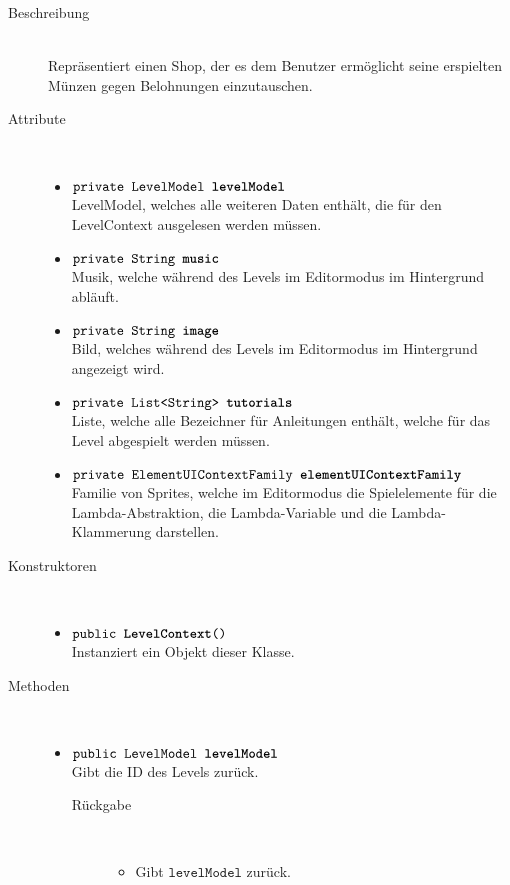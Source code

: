\begin{description}
\item[Beschreibung] \hfill \\ Repräsentiert einen Shop, der es dem Benutzer ermöglicht seine erspielten Münzen gegen Belohnungen einzutauschen.

\item[Attribute] \hfill \\
	\vspace{-.8cm}
	\begin{itemize}
		\item $\texttt{private LevelModel \textbf{levelModel}}$ \\ LevelModel, welches alle weiteren Daten enthält, die für den LevelContext ausgelesen werden müssen.
		\item $\texttt{private String \textbf{music}}$ \\ Musik, welche während des Levels im Editormodus im Hintergrund abläuft.
		\item $\texttt{private String \textbf{image}}$ \\ Bild, welches während des Levels im Editormodus im Hintergrund angezeigt wird.
		\item $\texttt{private List<String> \textbf{tutorials}}$ \\ Liste, welche alle Bezeichner für Anleitungen enthält, welche für das Level abgespielt werden müssen.
		\item $\texttt{private ElementUIContextFamily \textbf{elementUIContextFamily}}$ \\ Familie von Sprites, welche im Editormodus die Spielelemente für die Lambda-Abstraktion, die Lambda-Variable und die Lambda-Klammerung darstellen.
		\end{itemize}
	
\item[Konstruktoren] \hfill \\
	\vspace{-.8cm}
	\begin{itemize}
		\item $\texttt{public \textbf{LevelContext}()}$ \\ Instanziert ein Objekt dieser Klasse.

	\end{itemize}
	
\item[Methoden] \hfill \\
	\vspace{-.8cm}
	\begin{itemize}
		\item $\texttt{public LevelModel \textbf{levelModel}}$ \\ Gibt die ID des Levels zurück.
		\begin{description}
			\item[Rückgabe] \hfill \\
			\vspace{-.8cm}
			\begin{itemize}
				\item Gibt $\texttt{levelModel}$ zurück.
			\end{itemize}
			\end{description}
		

\end{itemize}
\end{description}
